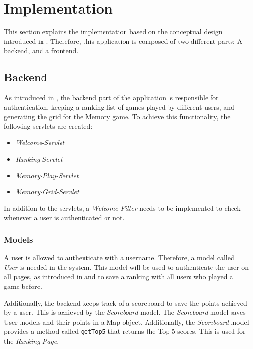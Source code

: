 \section{Implementation}\label{sec:03_impl}
This section explains the implementation based on the conceptual design introduced in .
Therefore, this application is composed of two different parts: A backend, and a frontend.


\subsection{Backend}\label{subsec:03_impl_backend}
%
As introduced in , the backend part of the application is responsible for authentication, keeping a ranking list of games played by different users, and generating the grid for the Memory game.
To achieve this functionality, the following servlets are created:
\begin{itemize}
\item \textit{Welcome-Servlet}
\item \textit{Ranking-Servlet}
\item \textit{Memory-Play-Servlet}
\item \textit{Memory-Grid-Servlet}
\end{itemize}
In addition to the servlets, a \textit{Welcome-Filter} needs to be implemented to check whenever a user is authenticated or not.

\subsubsection{Models}\label{subsubsec:03_impl_backend_models}
A user is allowed to authenticate with a username. Therefore, a model called \textit{User} is needed in the system.
This model will be used to authenticate the user on all pages, as introduced in  and to save a ranking with all users who played a game before.

Additionally, the backend keeps track of a scoreboard to save the points achieved by a user. This is achieved by the \textit{Scoreboard} model.
The \textit{Scoreboard} model saves User models and their points in a Map object.
Additionally, the \textit{Scoreboard} model provides a method called \texttt{getTop5} that returns the Top 5 scores. This is used for the \textit{Ranking-Page}.

